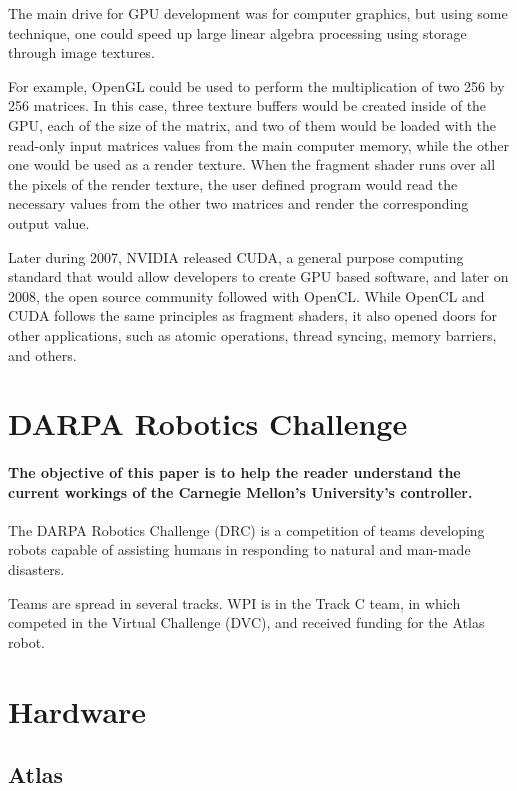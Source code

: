 \documentclass{article}
\begin{document}
The main drive for GPU development was for computer graphics, but using some technique, one could speed up large linear algebra processing using storage through image textures. \cite{Goeddeke:2005:GBM}

For example, OpenGL could be used to perform the multiplication of two 256 by 256 matrices. In this case, three texture buffers would be created inside of the GPU, each of the size of the matrix, and two of them would be loaded with the read-only input matrices values from the main computer memory, while the other one would be used as a render texture. When the fragment shader runs over all the pixels of the render texture, the user defined program would read the necessary values from the other two matrices and render the corresponding output value. 

Later during 2007, NVIDIA released CUDA, a general purpose computing standard that would allow developers to create GPU based software, and later on 2008, the open source community followed with OpenCL. While OpenCL and CUDA follows the same principles as fragment shaders, it also opened doors for other applications, such as atomic operations, thread syncing, memory barriers, and others.

\pagebreak

\section{DARPA Robotics Challenge}
\paragraph{The objective of this paper is to help the reader understand the current workings of the Carnegie Mellon’s University’s controller.}  
 
The DARPA Robotics Challenge (DRC) is a competition of teams developing robots capable of assisting humans in responding to natural and man-made disasters.   
 
Teams are spread in several tracks. WPI is in the Track C team, in which competed in the Virtual Challenge (DVC), and received funding for the Atlas robot.  

\section{Hardware}
\subsection{Atlas}
\end{document}
